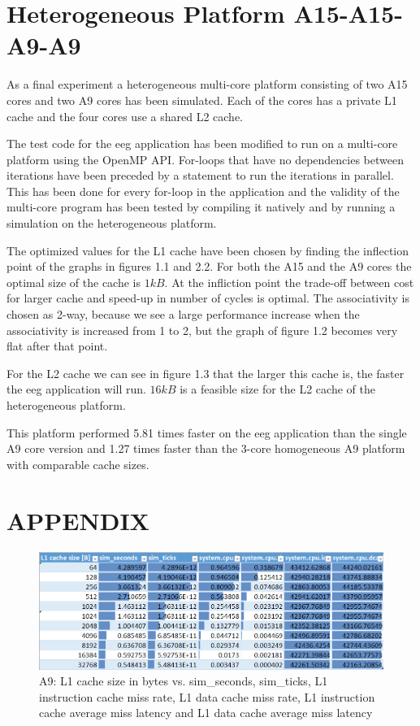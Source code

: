 \documentclass[a4paper, 10pt, conference]{ieeeconf}      %
\begin{document}
\section{Heterogeneous Platform A15-A15-A9-A9}
As a final experiment a heterogeneous multi-core platform consisting of two A15 cores and two A9 cores has been simulated. Each of the cores has a private L1 cache and the four cores use a shared L2 cache.

The test code for the eeg application has been modified to run on a multi-core platform using the OpenMP API. For-loops that have no dependencies between iterations have been preceded by a statement to run the iterations in parallel. This has been done for every for-loop in the application and the validity of the multi-core program has been tested by compiling it natively and by running a simulation on the heterogeneous platform.

The optimized values for the L1 cache have been chosen by finding the inflection point of the graphs in figures 1.1 and 2.2. For both the A15 and the A9 cores the optimal size of the cache is $1kB$. At the infliction point the trade-off between cost for larger cache and speed-up in number of cycles is optimal. The associativity is chosen as 2-way, because we see a large performance increase when the associativity is increased from 1 to 2, but the graph of figure 1.2 becomes very flat after that point.

For the L2 cache we can see in figure 1.3 that the larger this cache is, the faster the eeg application will run. $16kB$ is a feasible size for the L2 cache of the heterogeneous platform.

This platform performed 5.81 times faster on the eeg application than the single A9 core version and 1.27 times faster than the 3-core homogeneous A9 platform with comparable cache sizes.

\newpage
\onecolumn
\section*{APPENDIX}

\begin{figure}[thpb]
\centering
\includegraphics[scale=0.7]{Figures/assignment1_1_table.png}
\caption{A9: L1 cache size in bytes vs. sim\_seconds, sim\_ticks, L1 instruction cache miss rate, L1 data cache miss rate, L1 instruction cache average miss latency and L1 data cache average miss latency}
\label{Afigure1_1}
\end{figure}
\end{document}
